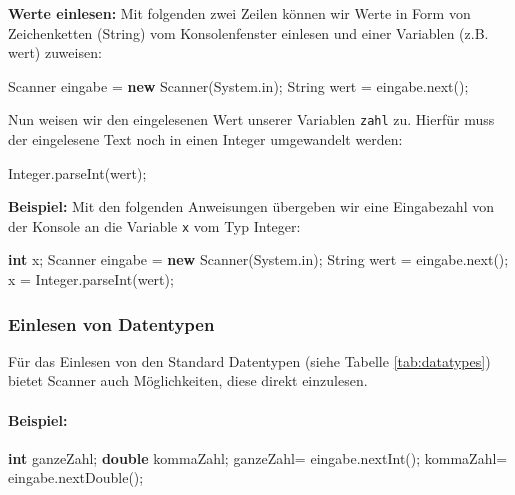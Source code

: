 \documentclass[10pt,paper=17cm:22cm, twoside=true, DIV=14]{scrbook}
\newenvironment {Shaded}
        {\begin{mdframed}[style=code] }
         {\end{mdframed}}
\newcommand{\KeywordTok}[1]{\textcolor[rgb]{0.1,0.1,0.1}{\textbf{#1}}}
\newcommand{\DataTypeTok}[1]{\textcolor[rgb]{0.1,0.1,0.1}{\textbf{#1}}}
\newcommand{\FunctionTok}[1]{\textcolor[rgb]{0.2,0.2,0.2}{#1}}
\newcommand{\NormalTok}[1]{#1}
\begin{document}
\textbf{Werte einlesen:} Mit folgenden zwei Zeilen können wir Werte in
Form von Zeichenketten (String) vom Konsolenfenster einlesen und einer
Variablen (z.B. wert) zuweisen:

\begin{Shaded}
\begin{Highlighting}[]
\NormalTok{Scanner eingabe = }\KeywordTok{new} \NormalTok{Scanner(System.}\FunctionTok{in}\NormalTok{);}
\NormalTok{String wert = eingabe.}\FunctionTok{next}\NormalTok{();}
\end{Highlighting}
\end{Shaded}

Nun weisen wir den eingelesenen Wert unserer Variablen \texttt{zahl} zu.
Hierfür muss der eingelesene Text noch in einen Integer umgewandelt
werden:

\begin{Shaded}
\begin{Highlighting}[]
\NormalTok{Integer.}\FunctionTok{parseInt}\NormalTok{(wert);}
\end{Highlighting}
\end{Shaded}

\textbf{Beispiel:} Mit den folgenden Anweisungen übergeben wir eine
Eingabezahl von der Konsole an die Variable \texttt{x} vom Typ Integer:

\begin{Shaded}
\begin{Highlighting}[]
\DataTypeTok{int} \NormalTok{x;}
\NormalTok{Scanner eingabe = }\KeywordTok{new} \NormalTok{Scanner(System.}\FunctionTok{in}\NormalTok{);}
\NormalTok{String wert = eingabe.}\FunctionTok{next}\NormalTok{();}
\NormalTok{x = Integer.}\FunctionTok{parseInt}\NormalTok{(wert);}
\end{Highlighting}
\end{Shaded}

\subsubsection{Einlesen von Datentypen}\label{einlesen-von-datentypen-1}

Für das Einlesen von den Standard Datentypen (siehe Tabelle
\ref{tab:datatypes}) bietet Scanner auch Möglichkeiten, diese direkt
einzulesen.

\paragraph{Beispiel:}\label{beispiel-19}

\begin{Shaded}
\begin{Highlighting}[]
\DataTypeTok{int} \NormalTok{ganzeZahl;}
\DataTypeTok{double} \NormalTok{kommaZahl;}
\NormalTok{ganzeZahl= eingabe.}\FunctionTok{nextInt}\NormalTok{();}
\NormalTok{kommaZahl= eingabe.}\FunctionTok{nextDouble}\NormalTok{();}
\end{Highlighting}
\end{Shaded}
\end{document}
